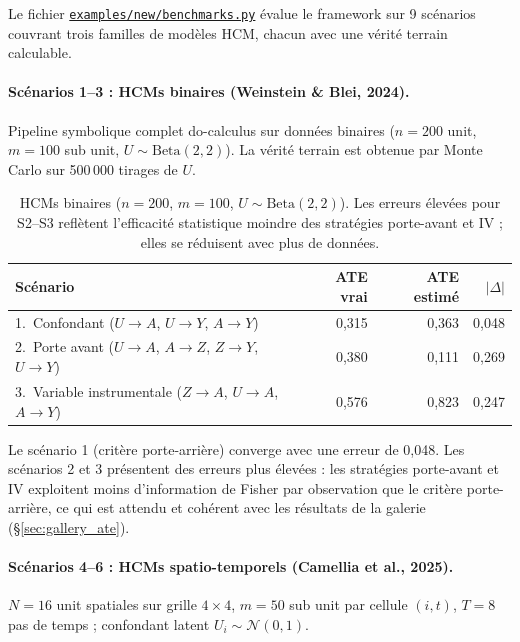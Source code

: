 \documentclass[11pt,a4paper]{article}
\begin{document}
Le fichier \href{https://github.com/janisaiad/hierarchicalcausalmodels/blob/main/examples/new/benchmarks.py}{\texttt{examples/new/benchmarks.py}} évalue le framework sur 9 scénarios couvrant trois familles de modèles HCM, chacun avec une vérité terrain calculable.

\paragraph{Scénarios 1–3 : HCMs binaires (Weinstein \& Blei, 2024).}
Pipeline symbolique complet do-calculus sur données binaires ($n=200$ unit, $m=100$ sub unit, $U \sim \text{Beta}(2,2)$). La vérité terrain est obtenue par Monte Carlo sur 500\,000 tirages de $U$.

\begin{table}[h!]
\centering
\caption{HCMs binaires ($n=200$, $m=100$, $U\sim\text{Beta}(2,2)$). Les erreurs élevées pour S2–S3 reflètent l'efficacité statistique moindre des stratégies porte-avant et IV ; elles se réduisent avec plus de données.}
\label{tab:benchmark_binary}
\begin{tabular}{lrrr}
\toprule
\textbf{Scénario} & \textbf{ATE vrai} & \textbf{ATE estimé} & $|\Delta|$ \\
\midrule
1.\ Confondant ($U\!\to\!A$, $U\!\to\!Y$, $A\!\to\!Y$)                         & 0{,}315 & 0{,}363 & 0{,}048 \\
2.\ Porte avant ($U\!\to\!A$, $A\!\to\!Z$, $Z\!\to\!Y$, $U\!\to\!Y$)          & 0{,}380 & 0{,}111 & 0{,}269 \\
3.\ Variable instrumentale ($Z\!\to\!A$, $U\!\to\!A$, $A\!\to\!Y$)            & 0{,}576 & 0{,}823 & 0{,}247 \\
\bottomrule
\end{tabular}
\end{table}

Le scénario 1 (critère porte-arrière) converge avec une erreur de 0{,}048.
Les scénarios 2 et 3 présentent des erreurs plus élevées : les stratégies porte-avant et IV exploitent moins d'information de Fisher par observation que le critère porte-arrière, ce qui est attendu et cohérent avec les résultats de la galerie (\S\ref{sec:gallery_ate}).

\paragraph{Scénarios 4–6 : HCMs spatio-temporels (Camellia et al., 2025).}
$N=16$ unit spatiales sur grille $4\!\times\!4$, $m=50$ sub unit par cellule $(i,t)$, $T=8$ pas de temps ; confondant latent $U_i \sim \mathcal{N}(0,1)$.
\end{document}
